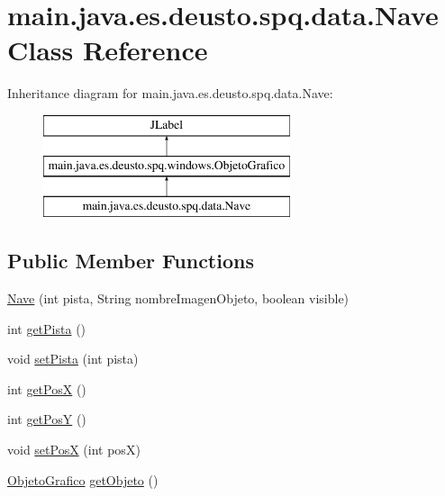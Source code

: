 \hypertarget{classmain_1_1java_1_1es_1_1deusto_1_1spq_1_1data_1_1_nave}{}\section{main.\+java.\+es.\+deusto.\+spq.\+data.\+Nave Class Reference}
\label{classmain_1_1java_1_1es_1_1deusto_1_1spq_1_1data_1_1_nave}
Inheritance diagram for main.\+java.\+es.\+deusto.\+spq.\+data.\+Nave\+:\begin{figure}[H]
\begin{center}
\leavevmode
\includegraphics[height=3.000000cm]{classmain_1_1java_1_1es_1_1deusto_1_1spq_1_1data_1_1_nave}
\end{center}
\end{figure}
\subsection*{Public Member Functions}
\begin{DoxyCompactItemize}
\item 
\hyperlink{classmain_1_1java_1_1es_1_1deusto_1_1spq_1_1data_1_1_nave_ad2df839aa519eed3dc6969a4292c919b}{Nave} (int pista, String nombre\+Imagen\+Objeto, boolean visible)
\item 
int \hyperlink{classmain_1_1java_1_1es_1_1deusto_1_1spq_1_1data_1_1_nave_a4a54dc025123f959846957e133459958}{get\+Pista} ()
\item 
void \hyperlink{classmain_1_1java_1_1es_1_1deusto_1_1spq_1_1data_1_1_nave_a07d4110ba3ac3e0297e630ae6e7a5a00}{set\+Pista} (int pista)
\item 
int \hyperlink{classmain_1_1java_1_1es_1_1deusto_1_1spq_1_1data_1_1_nave_aefcef801bb26ef25482cc1f492c33172}{get\+PosX} ()
\item 
int \hyperlink{classmain_1_1java_1_1es_1_1deusto_1_1spq_1_1data_1_1_nave_af53c86dfc920b5bf22fe98db02fc1ce1}{get\+PosY} ()
\item 
void \hyperlink{classmain_1_1java_1_1es_1_1deusto_1_1spq_1_1data_1_1_nave_aac3371b6d4f834a98d4e75597f907f02}{set\+PosX} (int posX)
\item 
\hyperlink{classmain_1_1java_1_1es_1_1deusto_1_1spq_1_1windows_1_1_objeto_grafico}{Objeto\+Grafico} \hyperlink{classmain_1_1java_1_1es_1_1deusto_1_1spq_1_1data_1_1_nave_a710104076a257d0ddfcf79287d7863f1}{get\+Objeto} ()
\end{DoxyCompactItemize}

